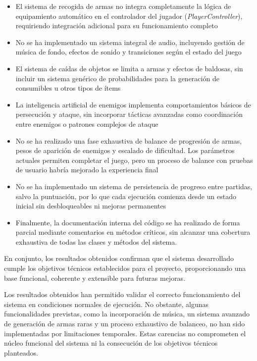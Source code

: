 \begin{itemize}
    \item El sistema de recogida de armas no integra completamente la lógica de equipamiento automático en el controlador del jugador (\textit{PlayerController}), requiriendo integración adicional para su funcionamiento completo
    \item No se ha implementado un sistema integral de audio, incluyendo gestión de música de fondo, efectos de sonido y transiciones según el estado del juego
    \item El sistema de caídas de objetos se limita a armas y efectos de baldosas, sin incluir un sistema genérico de probabilidades para la generación de consumibles u otros tipos de ítems
    \item La inteligencia artificial de enemigos implementa comportamientos básicos de persecución y ataque, sin incorporar tácticas avanzadas como coordinación entre enemigos o patrones complejos de ataque
    \item No se ha realizado una fase exhaustiva de balance de progresión de armas, pesos de aparición de enemigos y escalado de dificultad. Los parámetros actuales permiten completar el juego, pero un proceso de balance con pruebas de usuario habría mejorado la experiencia final
    \item No se ha implementado un sistema de persistencia de progreso entre partidas, salvo la puntuación, por lo que cada ejecución comienza desde un estado inicial sin desbloqueables ni mejoras permanentes
    \item Finalmente, la documentación interna del código se ha realizado de forma parcial mediante comentarios en métodos críticos, sin alcanzar una cobertura exhaustiva de todas las clases y métodos del sistema.
\end{itemize}

En conjunto, los resultados obtenidos confirman que el sistema desarrollado cumple los objetivos técnicos establecidos para el proyecto, proporcionando una base funcional, coherente y extensible para futuras mejoras.

Los resultados obtenidos han permitido validar el correcto funcionamiento del sistema en condiciones normales de ejecución. No obstante, algunas funcionalidades previstas, como la incorporación de música, un sistema avanzado de generación de armas raras y un proceso exhaustivo de balanceo, no han sido implementadas por limitaciones temporales. Estas carencias no comprometen el núcleo funcional del sistema ni la consecución de los objetivos técnicos planteados.

